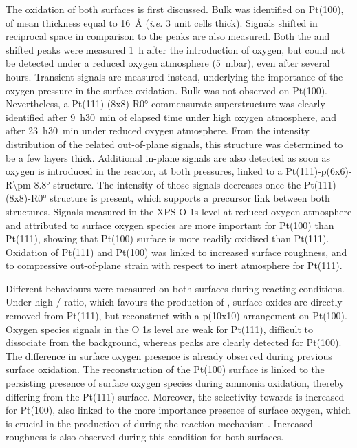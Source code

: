 The oxidation of both surfaces is first discussed.
Bulk  was identified on Pt(100), of mean thickness equal to \qty{16}{\angstrom} (\textit{i.e.} 3 unit cells thick).
Signals shifted in reciprocal space in comparison to the  peaks are also measured.
Both the  and shifted peaks were measured \qty{1}{\hour} after the introduction of oxygen, but could not be detected under a reduced oxygen atmosphere (\qty{5}{\milli\bar}), even after several hours.
Transient signals are measured instead, underlying the importance of the oxygen pressure in the surface oxidation.
Bulk  was not observed on Pt(100).
Nevertheless, a Pt(111)-(8x8)-R\ang{0} commensurate superstructure was clearly identified after \qty{9}{\hour}\qty{30}{\minute} of elapsed time under high oxygen atmosphere, and after \qty{23}{\hour}\qty{30}{\minute} under reduced oxygen atmosphere.
From the intensity distribution of the related out-of-plane signals, this structure was determined to be a few layers thick.
Additional in-plane signals are also detected as soon as oxygen is introduced in the reactor, at both pressures, linked to a Pt(111)-p(6x6)-R\ang{\pm 8.8} structure.
The intensity of those signals decreases once the Pt(111)-(8x8)-R\ang{0} structure is present, which supports a precursor link between both structures.
Signals measured in the XPS O 1s level at reduced oxygen atmosphere and attributed to surface oxygen species are more important for Pt(100) than Pt(111), showing that Pt(100) surface is more readily oxidised than Pt(111).
Oxidation of Pt(111) and Pt(100) was linked to increased surface roughness, and to compressive out-of-plane strain with respect to inert atmosphere for Pt(111).

Different behaviours were measured on both surfaces during reacting conditions.
Under high / ratio, which favours the production of , surface oxides are directly removed from Pt(111), but reconstruct with a p(10x10) arrangement on Pt(100).
Oxygen species signals in the O 1s level are weak for Pt(111), difficult to dissociate from the background, whereas peaks are clearly detected for Pt(100).
The difference in surface oxygen presence is already observed during previous surface oxidation.
The reconstruction of the Pt(100) surface is linked to the persisting presence of surface oxygen species during ammonia oxidation, thereby differing from the Pt(111) surface.
Moreover, the selectivity towards  is increased for Pt(100), also linked to the more importance presence of surface oxygen, which is crucial in the production of  during the reaction mechanism \parencite{NovellLeruth2005, Offermans2006, Offermans2007, Imbihl2007, NovellLeruth2008}.
Increased roughness is also observed during this condition for both surfaces.

